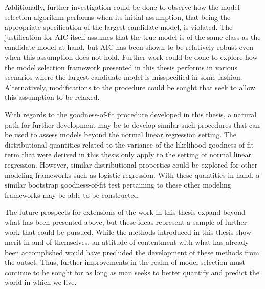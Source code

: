 		Additionally, further investigation could be done to observe how the model selection algorithm performs when its initial assumption, that being the appropriate
		specification of the largest candidate model, is violated. The justification for AIC itself assumes that the true model is of the same class as the candidate model
		at hand, but AIC has been shown to be relatively robust even when this assumption does not hold. Further work could be done to explore how the model selection
		framework presented in this thesis performs in various scenarios where the largest candidate model is misspecified in some fashion. Alternatively, modifications
		to the procedure could be sought that seek to allow this assumption to be relaxed.

		With regards to the goodness-of-fit procedure developed in this thesis, a natural path for further development may be to develop similar such procedures that can
		be used to assess models beyond the normal linear regression setting. The distributional quantities related to the variance of the likelihood goodness-of-fit term that were derived
		in this thesis only apply to the setting of normal linear regression. However, similar distributional properties could be explored for other modeling frameworks such
		as logistic regression. With these quantities in hand, a similar bootstrap goodness-of-fit test pertaining to these other modeling frameworks may be able to be constructed.
		
		The future prospects for extensions of the work in this thesis expand beyond what has been presented above, but these ideas represent a sample of further work that
		could be pursued. While the methods introduced in this thesis show merit in and of themselves, an attitude of contentment with what has already been accomplished
		would have precluded the development of these methods from the outset. Thus, further improvements in the realm of model selection must continue to be sought for as long as
		man seeks to better quantify and predict the world in which we live.
		
		
		